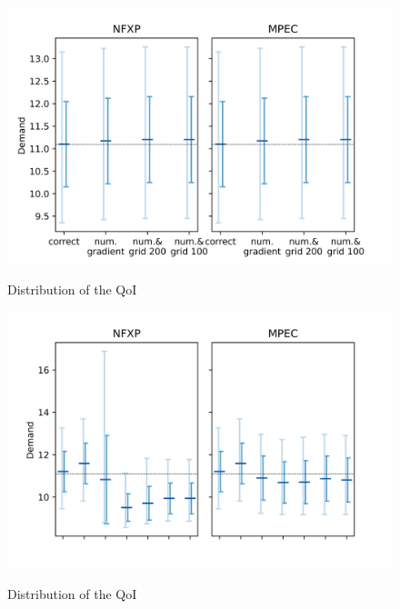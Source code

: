 \begin{figure}[H]
	\caption{Distribution of the QoI}
	\vspace*{-4mm}
	\centering
	\includegraphics[scale=0.9]{../figures/figure_8.png}
	\label{figure8}
\end{figure}

\begin{figure}[H]
	\caption{Distribution of the QoI}
	\vspace*{-4mm}
	\centering
	\includegraphics[scale=0.9]{../figures/figure_9.png}
	\label{figure9}
\end{figure}

